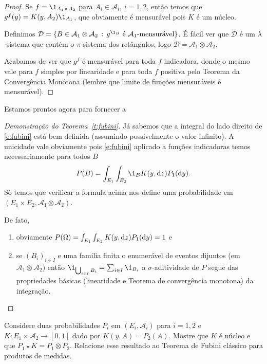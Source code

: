 \begin{proof}
  Se $f = \1_{A_1 \times A_2}$ para $A_i \in \mathcal{A}_i$, $i = 1,2$, então temos que $g^f(y) = K(y, A_2) \1_{A_1}$, que obviamente é mensurável pois $K$ é um núcleo.

  Definimos $\mathcal{D} = \{B \in \mathcal{A}_1 \otimes \mathcal{A}_2\, : \, g^{\1_B} \text{ é $\mathcal{A}_1$-mensurável}\}$.
  É fácil ver que $\mathcal{D}$ é um $\lambda$-sistema que contém o $\pi$-sistema dos retângulos, logo $\mathcal{D} = \mathcal{A}_1 \otimes \mathcal{A}_2$.

  Acabamos de ver que $g^f$ é mensurável para toda $f$ indicadora, donde o mesmo vale para $f$ simples por linearidade e para toda $f$ positiva pelo Teorema da Convergência Monótona (lembre que limite de funções mensuráveis é mensurável).
\end{proof}

Estamos prontos agora para fornecer a
\begin{proof}[Demonstração do Teorema~\ref{t:fubini}]
  Já sabemos que a integral do lado direito de \eqref{e:fubini} está bem definida (assumindo possivelmente o valor infinito).
  A unicidade vale obviamente pois \eqref{e:fubini} aplicado a funções indicadoras temos necessariamente para todos $B$
\begin{equation}
    P(B) = \int_{E_1} \int_{E_2} \1_{B} K(y, \d z) P_1 (\d y).
  \end{equation}
  Sò temos que verificar a formula acima nos define uma probabilidade em $(E_1 \times E_2, \mathcal{A}_1 \otimes \mathcal{A}_2)$.

  De fato,
  \begin{enumerate}[\quad a)]
  \item obviamente $P(\Omega) = \int_{E_1} \int_{E_2}  K(y, \mathop{}\!\mathrm{d} z) P_1(\mathop{}\!\mathrm{d} y) = 1$ e
  \item se $(B_i)_{i\in I}$ e uma familia finita o enumerável de eventos dijuntos (em $\mathcal{A}_1 \otimes \mathcal{A}_2$) então 
  $\1_{\bigcup_{i\in I} B_i}=\sum_{i\in I} \1_{B_i}$ a $\sigma$-aditividade de $P$ segue das propriedades básicas 
  (linearidade e Teorema de convergência monotona) da integração.
  \end{enumerate}
\end{proof}

\begin{exercise}
  \label{x:nucleo_constante}
  Considere duas probabilidades $P_i$ em $(E_i, \mathcal{A}_i)$ para $i = 1,2$ e $K:E_1 \times \mathcal{A}_2 \to [0,1]$ dado por $K(y,A) = P_2(A)$.
  Mostre que $K$ é núcleo e que $P_1 \star K = P_1 \otimes P_2$.
  Relacione esse resultado ao Teorema de Fubini clássico para produtos de medidas.
\end{exercise}


